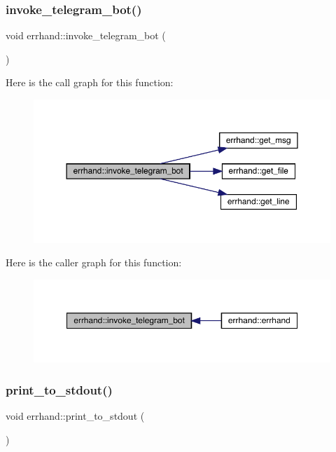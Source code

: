 \subsubsection{\texorpdfstring{invoke\+\_\+telegram\+\_\+bot()}{invoke\_telegram\_bot()}}
{\footnotesize\ttfamily void errhand\+::invoke\+\_\+telegram\+\_\+bot (\begin{DoxyParamCaption}{ }\end{DoxyParamCaption})\hspace{0.3cm}{\ttfamily [inline]}}

Here is the call graph for this function\+:\nopagebreak
\begin{figure}[H]
\begin{center}
\leavevmode
\includegraphics[width=350pt]{classerrhand_adbc86e81b391a68d2bf9a13529c977d3_cgraph}
\end{center}
\end{figure}
Here is the caller graph for this function\+:\nopagebreak
\begin{figure}[H]
\begin{center}
\leavevmode
\includegraphics[width=350pt]{classerrhand_adbc86e81b391a68d2bf9a13529c977d3_icgraph}
\end{center}
\end{figure}
\mbox{\label{classerrhand_a5b4d8a74f1d0c6842526dc8b54e38dc2}} 
\subsubsection{\texorpdfstring{print\+\_\+to\+\_\+stdout()}{print\_to\_stdout()}}
{\footnotesize\ttfamily void errhand\+::print\+\_\+to\+\_\+stdout (\begin{DoxyParamCaption}{ }\end{DoxyParamCaption})\hspace{0.3cm}{\ttfamily [inline]}}

